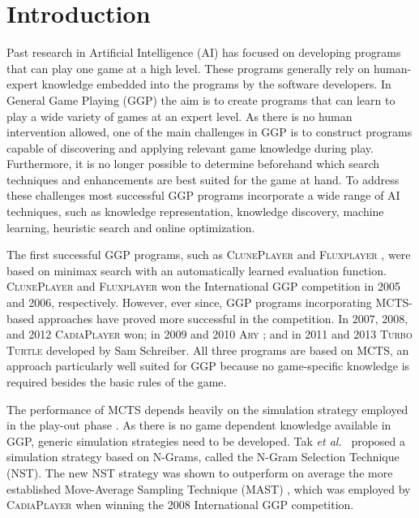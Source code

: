 \documentclass[journal]{IEEEtran}
\begin{document}
\section{Introduction}
Past research in Artificial Intelligence (AI) has focused on developing programs that can play one game at a high level. These programs generally rely on human-expert knowledge embedded into the programs by the software developers. In General Game Playing (GGP) the aim is to create programs that can learn to play a wide variety of games at an expert level. As there is no human intervention allowed, one of the main challenges in GGP is to construct programs capable of discovering and applying relevant game knowledge during play.
Furthermore, it is no longer possible to determine beforehand which search techniques and enhancements are best suited for the game at hand. To address these challenges most successful GGP programs incorporate a wide range of AI techniques, such as knowledge representation, knowledge discovery, machine learning, heuristic search and online optimization.

The first successful GGP programs, such as \textsc{ClunePlayer} \cite{Cluneplayer} and \textsc{Fluxplayer} \cite{fluxplayer2,fluxplayer1}, were based on minimax search with an automatically learned evaluation function. \textsc{ClunePlayer} and \textsc{Fluxplayer} won the International GGP competition in 2005 and 2006, respectively. However, ever since, GGP programs incorporating MCTS-based approaches have proved more successful in the competition.  In 2007, 2008, and 2012 \textsc{CadiaPlayer} \cite{BjornssonF09,finnsonphdthesis} won;  in 2009 and 2010 \textsc{Ary} \cite{ary}; and in 2011 and 2013 \textsc{Turbo Turtle} developed by Sam Schreiber. All three programs are based on MCTS, an approach particularly well suited for GGP because no game-specific knowledge is required besides the basic rules of the game.

The performance of MCTS depends heavily on the simulation strategy employed in the play-out phase \cite{Gelly:2007}. As there is no game dependent knowledge available in GGP, generic simulation strategies need to be developed. Tak \emph{et al.}~\cite{ngramArticle} proposed a simulation strategy based on N-Grams, called the N-Gram Selection Technique (NST).  The new NST strategy was shown to  outperform on average the more established Move-Average Sampling Technique (MAST) \cite{FinnssonB08a}, which was employed by \textsc{CadiaPlayer} when winning the 2008 International GGP competition.
\end{document}

